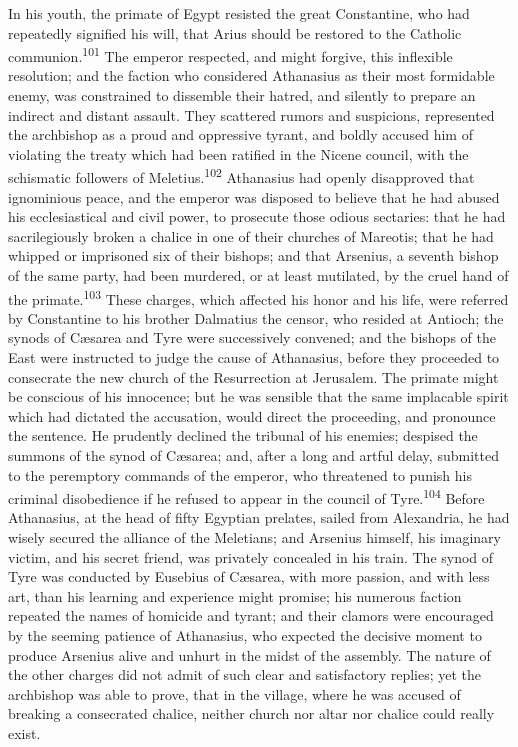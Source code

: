 In his youth, the primate of Egypt resisted the great
Constantine, who had repeatedly signified his will, that Arius
should be restored to the Catholic communion.\textsuperscript{101} The emperor
respected, and might forgive, this inflexible resolution; and the
faction who considered Athanasius as their most formidable enemy,
was constrained to dissemble their hatred, and silently to
prepare an indirect and distant assault. They scattered rumors
and suspicions, represented the archbishop as a proud and
oppressive tyrant, and boldly accused him of violating the treaty
which had been ratified in the Nicene council, with the
schismatic followers of Meletius.\textsuperscript{102} Athanasius had openly
disapproved that ignominious peace, and the emperor was disposed
to believe that he had abused his ecclesiastical and civil power,
to prosecute those odious sectaries: that he had sacrilegiously
broken a chalice in one of their churches of Mareotis; that he
had whipped or imprisoned six of their bishops; and that
Arsenius, a seventh bishop of the same party, had been murdered,
or at least mutilated, by the cruel hand of the primate.\textsuperscript{103}
These charges, which affected his honor and his life, were
referred by Constantine to his brother Dalmatius the censor, who
resided at Antioch; the synods of Cæsarea and Tyre were
successively convened; and the bishops of the East were
instructed to judge the cause of Athanasius, before they
proceeded to consecrate the new church of the Resurrection at
Jerusalem. The primate might be conscious of his innocence; but
he was sensible that the same implacable spirit which had
dictated the accusation, would direct the proceeding, and
pronounce the sentence. He prudently declined the tribunal of his
enemies; despised the summons of the synod of Cæsarea; and, after
a long and artful delay, submitted to the peremptory commands of
the emperor, who threatened to punish his criminal disobedience
if he refused to appear in the council of Tyre.\textsuperscript{104} Before
Athanasius, at the head of fifty Egyptian prelates, sailed from
Alexandria, he had wisely secured the alliance of the Meletians;
and Arsenius himself, his imaginary victim, and his secret
friend, was privately concealed in his train. The synod of Tyre
was conducted by Eusebius of Cæsarea, with more passion, and with
less art, than his learning and experience might promise; his
numerous faction repeated the names of homicide and tyrant; and
their clamors were encouraged by the seeming patience of
Athanasius, who expected the decisive moment to produce Arsenius
alive and unhurt in the midst of the assembly. The nature of the
other charges did not admit of such clear and satisfactory
replies; yet the archbishop was able to prove, that in the
village, where he was accused of breaking a consecrated chalice,
neither church nor altar nor chalice could really exist.

